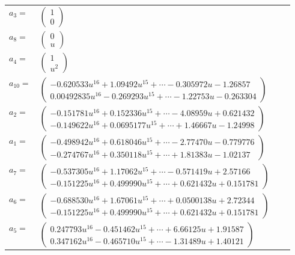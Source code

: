 \documentclass[1p]{elsarticle_modified}
\theoremstyle{definition}
\begin{document}
\begin{tabular}{m{7pt} m{180pt} m{7pt} m{180pt} }
\flushright $a_{3}=$&$\begin{pmatrix}1\\0\end{pmatrix}$ \\
\flushright $a_{8}=$&$\begin{pmatrix}0\\u\end{pmatrix}$ \\
\flushright $a_{4}=$&$\begin{pmatrix}1\\u^2\end{pmatrix}$ \\
\flushright $a_{10}=$&$\begin{pmatrix}-0.620533 u^{16}+1.09492 u^{15}+\cdots-0.305972 u-1.26857\\0.00492835 u^{16}-0.269293 u^{15}+\cdots-1.22753 u-0.263304\end{pmatrix}$ \\
\flushright $a_{2}=$&$\begin{pmatrix}-0.151781 u^{16}+0.152336 u^{15}+\cdots-4.08959 u+0.621432\\-0.149622 u^{16}+0.0695177 u^{15}+\cdots+1.46667 u-1.24998\end{pmatrix}$ \\
\flushright $a_{1}=$&$\begin{pmatrix}-0.498942 u^{16}+0.618046 u^{15}+\cdots-2.77470 u-0.779776\\-0.274767 u^{16}+0.350118 u^{15}+\cdots+1.81383 u-1.02137\end{pmatrix}$ \\
\flushright $a_{7}=$&$\begin{pmatrix}-0.537305 u^{16}+1.17062 u^{15}+\cdots-0.571419 u+2.57166\\-0.151225 u^{16}+0.499990 u^{15}+\cdots+0.621432 u+0.151781\end{pmatrix}$ \\
\flushright $a_{6}=$&$\begin{pmatrix}-0.688530 u^{16}+1.67061 u^{15}+\cdots+0.0500138 u+2.72344\\-0.151225 u^{16}+0.499990 u^{15}+\cdots+0.621432 u+0.151781\end{pmatrix}$ \\
\flushright $a_{5}=$&$\begin{pmatrix}0.247793 u^{16}-0.451462 u^{15}+\cdots+6.66125 u+1.91587\\0.347162 u^{16}-0.465710 u^{15}+\cdots-1.31489 u+1.40121\end{pmatrix}$ \\

\end{tabular}
\end{document}
